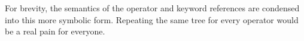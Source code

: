 For brevity, the semantics of the operator and keyword references are condensed
into this more symbolic form. Repeating the same tree for every operator would
be a real pain for everyone.

\begin{prooftree}
\end{prooftree}

\begin{prooftree}
\end{prooftree}

\begin{prooftree}
\end{prooftree}
